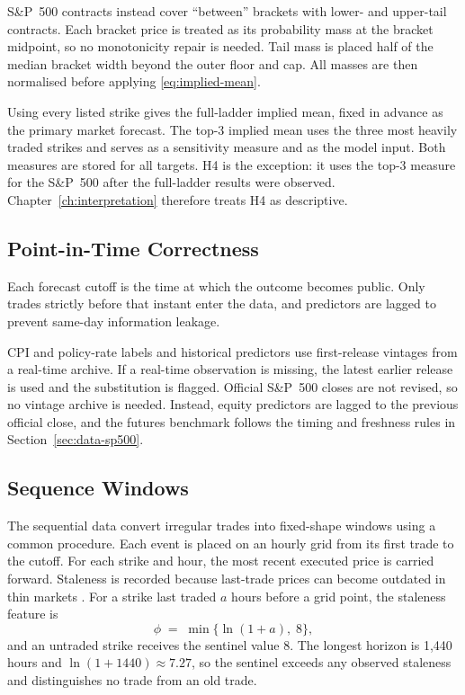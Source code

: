 \documentclass[12pt,a4paper]{report}
\begin{document}
S\&P~500 contracts instead cover ``between'' brackets with lower- and
upper-tail contracts. Each bracket price is treated as its probability mass
at the bracket midpoint, so no monotonicity repair is needed. Tail mass is
placed half of the median bracket width beyond the outer floor and cap. All
masses are then normalised before applying \eqref{eq:implied-mean}.

Using every listed strike gives the full-ladder implied mean, fixed in advance
as the primary market forecast. The top-3 implied mean uses the three most heavily traded
strikes and serves as a sensitivity measure and as the model input. Both
measures are stored for all targets. H4 is the exception: it uses the top-3
measure for the S\&P~500 after the full-ladder results were observed.
Chapter~\ref{ch:interpretation} therefore treats H4 as descriptive.

\subsection{Point-in-Time Correctness}
\label{sec:data-common-pit}

Each forecast cutoff is the time at which the outcome becomes public. Only
trades strictly before that instant enter the data, and predictors are lagged
to prevent same-day information leakage.

CPI and policy-rate labels and historical predictors use first-release
vintages from a real-time archive. If a real-time observation is missing, the
latest earlier release is used and the substitution is flagged. Official
S\&P~500 closes are not revised, so no vintage archive is needed. Instead,
equity predictors are lagged to the previous official close, and the futures
benchmark follows the timing and freshness rules in
Section~\ref{sec:data-sp500}.


\subsection{Sequence Windows}
\label{sec:data-common-windows}

The sequential data convert irregular trades into fixed-shape windows using a
common procedure. Each event is placed on an hourly grid from its first trade
to the cutoff. For each strike and hour, the most recent executed price is
carried forward. Staleness is recorded because last-trade prices can become
outdated in thin markets \parencite{greene2026}. For a strike last traded $a$
hours before a grid point, the staleness feature is
\begin{equation}
\label{eq:staleness}
\phi \;=\; \min\bigl\{\ln(1 + a),\; 8\bigr\},
\end{equation}
and an untraded strike receives the sentinel value $8$. The longest horizon is
1{,}440 hours and $\ln(1+1440) \approx 7.27$, so the sentinel exceeds any
observed staleness and distinguishes no trade from an old trade.
\end{document}
